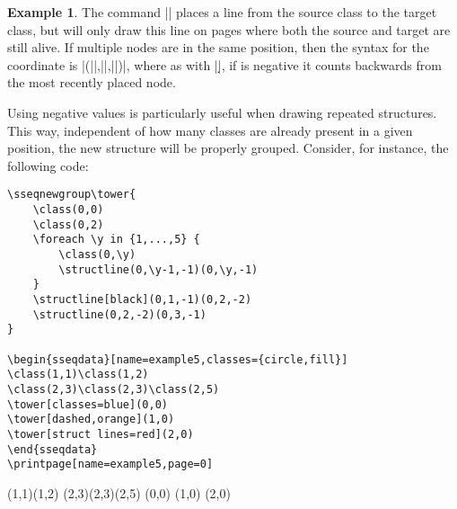 \documentclass[a4paper]{ltxdoc}
\theoremstyle{definition}
\newtheorem{ex}{Example}
\begin{document}
\begin{ex}
The command |\structline| places a line from the source class to the target class, but will only draw this line on pages where both the source and target are still alive. If multiple nodes are in the same position, then the syntax for the coordinate is |(||,||,||)|, where as with |\d|, if  is negative it counts backwards from the most recently placed node.

Using negative values is particularly useful when drawing repeated structures. This way, independent of how many classes are already present in a given position, the new structure will be properly grouped. Consider, for instance, the following code:

\begin{minipage}{0.7\textwidth}
\begin{verbatim}
\sseqnewgroup\tower{
    \class(0,0)
    \class(0,2)
    \foreach \y in {1,...,5} {
        \class(0,\y)
        \structline(0,\y-1,-1)(0,\y,-1)
    }
    \structline[black](0,1,-1)(0,2,-2)
    \structline(0,2,-2)(0,3,-1)
}

\begin{sseqdata}[name=example5,classes={circle,fill}]
\class(1,1)\class(1,2)
\class(2,3)\class(2,3)\class(2,5)
\tower[classes=blue](0,0)
\tower[dashed,orange](1,0)
\tower[struct lines=red](2,0)
\end{sseqdata}
\printpage[name=example5,page=0]
\end{verbatim}
\end{minipage}
\begin{minipage}{0.25\textwidth}
\sseqnewgroup{}

\begin{sseqdata}[name=example5,classes={circle,fill}]
\class(1,1)\class(1,2)
\class(2,3)\class(2,3)\class(2,5)
\tower[classes=blue](0,0)
\tower[struct lines=dashed,orange](1,0)
\tower[struct lines=red](2,0)
\end{sseqdata}
\printpage[name=example5,page=0]
\end{minipage}
\end{ex}
\end{document}
